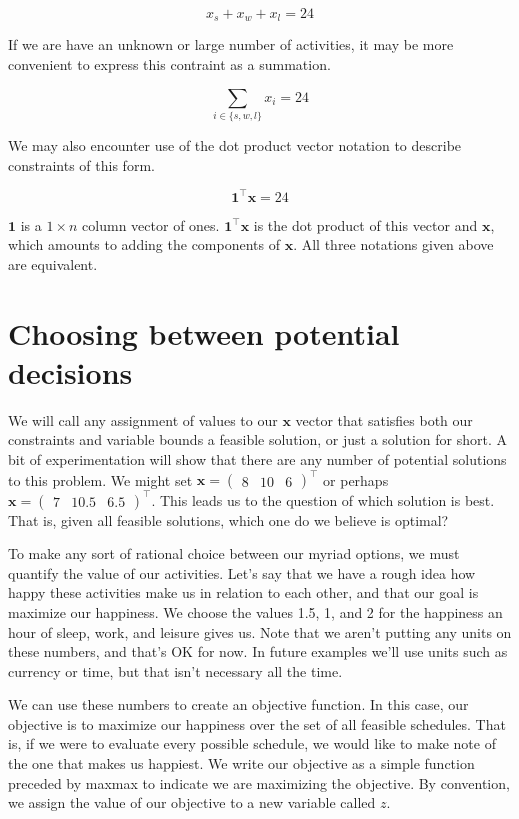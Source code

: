 $$x_s + x_w + x_l = 24$$

If we are have an unknown or large number of activities, it may be more convenient to express this contraint as a summation.

$$\sum_{i \in \{s, w, l\}} x_i = 24$$

We may also encounter use of the dot product vector notation to describe constraints of this form.

$$\mathbf{1}^\intercal \mathbf{x} = 24$$

$\mathbf{1}$ is a $1 \times n$ column vector of ones. $\mathbf{1}^\intercal \mathbf{x}$ is the dot product of this vector and $\mathbf{x}$, which amounts to adding the components of $\mathbf{x}$. All three notations given above are equivalent.


\section{Choosing between potential decisions}

We will call any assignment of values to our $\mathbf{x}$ vector that satisfies both our constraints and variable bounds a feasible solution, or just a solution for short. A bit of experimentation will show that there are any number of potential solutions to this problem. We might set $\mathbf{x} = \begin{pmatrix} 8 & 10 & 6\end{pmatrix}^\intercal$ or perhaps $\mathbf{x} = \begin{pmatrix} 7 & 10.5 & 6.5\end{pmatrix}^\intercal$. This leads us to the question of which solution is best. That is, given all feasible solutions, which one do we believe is optimal?

To make any sort of rational choice between our myriad options, we must quantify the value of our activities. Let's say that we have a rough idea how happy these activities make us in relation to each other, and that our goal is maximize our happiness. We choose the values 1.5, 1, and 2 for the happiness an hour of sleep, work, and leisure gives us. Note that we aren't putting any units on these numbers, and that's OK for now. In future examples we'll use units such as currency or time, but that isn't necessary all the time.

We can use these numbers to create an objective function. In this case, our objective is to maximize our happiness over the set of all feasible schedules. That is, if we were to evaluate every possible schedule, we would like to make note of the one that makes us happiest. We write our objective as a simple function preceded by maxmax to indicate we are maximizing the objective. By convention, we assign the value of our objective to a new variable called $z$.

